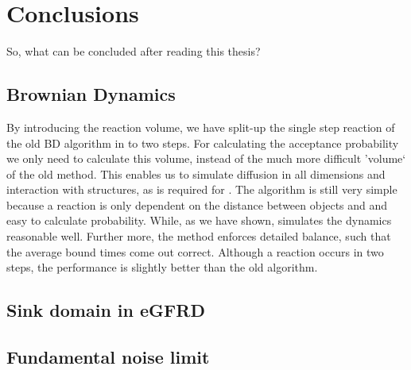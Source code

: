 \section{Conclusions}

So, what can be concluded after reading this thesis?

\subsection{Brownian Dynamics}
By introducing the reaction volume, we have split-up the single step reaction of the old BD algorithm in to two steps. For calculating the acceptance probability we only need to calculate this volume, instead of the much more difficult 'volume` of the old method. This enables us to simulate diffusion in all dimensions and interaction with structures, as is required for \GFRD. The algorithm is still very simple because a reaction is only dependent on the distance between objects and and easy to calculate probability. While, as we have shown, simulates the dynamics reasonable well. Further more, the method enforces detailed balance, such that the average bound times come out correct. Although a reaction occurs in two steps, the performance is slightly better than the old algorithm.



\subsection{Sink domain in eGFRD}




\subsection{Fundamental noise limit}

